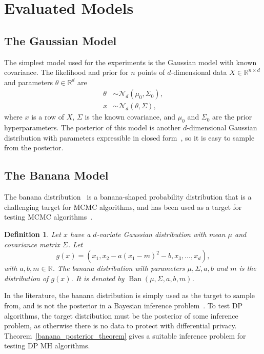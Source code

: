 \documentclass[english,twoside,openright]{HYgraduMLDS}
\newtheorem{definition}[lemma]{Definition}
\newcommand{\R}{\mathbb{R}}
\newcommand{\caln}{{\mathcal{N}}}
\DeclareMathOperator{\ban}{Ban}
\begin{document}
\section{Evaluated Models}\label{model_section}

\subsection*{The Gaussian Model}\label{gauss_model}

The simplest model used for the experiments is the Gaussian model with
known covariance. The likelihood and prior for \(n\) points of \(d\)-dimensional
data \(X \in \R^{n\times d}\) and parameters \(\theta\in \R^{d}\) are
\begin{align*}
  \theta &\sim \caln_{d}(\mu_{0}, \Sigma_{0}), \\
  x &\sim \caln_{d}(\theta, \Sigma),
\end{align*}
where \(x\) is a row of \(X\), \(\Sigma\) is the known covariance,
and \(\mu_{0}\) and \(\Sigma_{0}\) are the prior hyperparameters.
The posterior of this model is another \(d\)-dimensional Gaussian distribution
with parameters expressible in closed form~\cite[Section 3.5]{BDA},
so it is easy to sample from the posterior.

\subsection*{The Banana Model}\label{banana_section}

The banana distribution~\cite{TPK14} is a banana-shaped probability
distribution that is a challenging target for MCMC algorithms, and has been
used as a target for testing MCMC algorithms~\cite{TPK14}.

\begin{definition}
    Let \(x\) have a \(d\)-variate Gaussian distribution with
    mean \(\mu\) and covariance matrix \(\Sigma\). Let
    \[
        g(x) = (x_1, x_2 - a(x_1 - m)^2 - b, x_3, \dotsc, x_d),
    \]
    with \(a, b, m \in \R\).
    The banana distribution with parameters \(\mu, \Sigma, a, b\) and \(m\)
    is the distribution of \(g(x)\). It is denoted by
    \(\ban(\mu, \Sigma, a, b, m)\).
\end{definition}

In the literature, the banana distribution is simply used as the target to
sample from, and is not the posterior in a Bayesian inference
problem~\cite{TPK14}. To test DP algorithms, the
target distribution must be the posterior of some inference problem, as
otherwise there is no data to protect with differential privacy.
Theorem~\ref{banana_posterior_theorem} gives a suitable inference problem
for testing DP MH algorithms.
\end{document}
